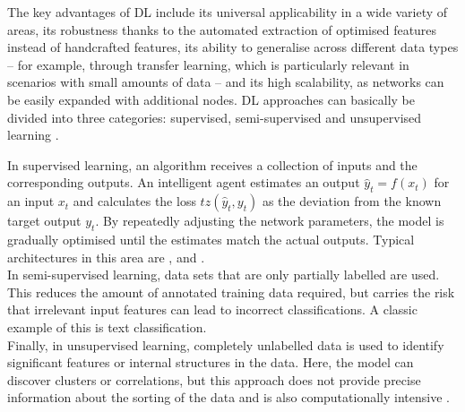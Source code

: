 The key advantages of \acrshort{DL} include its universal applicability in a wide variety of areas, its robustness thanks to the automated extraction of optimised features instead of handcrafted features, its ability to generalise across different data types – for example, through transfer learning, which is particularly relevant in scenarios with small amounts of data – and its high scalability, as networks can be easily expanded with additional nodes. DL approaches can basically be divided into three categories: supervised, semi-supervised and unsupervised learning \cite{Alzubaidi2021}.
  

In supervised learning, an algorithm receives a collection of inputs and the corresponding outputs. An intelligent agent estimates an output $\hat{y}_t = f(x_t)$ for an input $x_t$ and calculates the loss $tz(\hat{y}_t, y_t)$ as the deviation from the known target output $y_t$. By repeatedly adjusting the network parameters, the model is gradually optimised until the estimates match the actual outputs. Typical architectures in this area are ,  and . \\ In semi-supervised learning, data sets that are only partially labelled are used. This reduces the amount of annotated training data required, but carries the risk that irrelevant input features can lead to incorrect classifications. A classic example of this is text classification. \\ Finally, in unsupervised learning, completely unlabelled data is used to identify significant features or internal structures in the data. Here, the model can discover clusters or correlations, but this approach does not provide precise information about the sorting of the data and is also computationally intensive \cite{Alzubaidi2021}.
  

